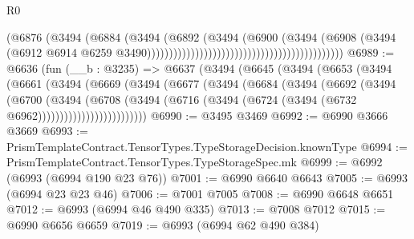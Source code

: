 \begin{lexlean}{R0}
\begin{coremodule}
                                                                        (@6876
                                                                          (@3494
                                                                            (@6884
                                                                              (@3494
                                                                                (@6892
                                                                                  (@3494
                                                                                    (@6900
                                                                                      (@3494
                                                                                        (@6908
                                                                                          (@3494
                                                                                            (@6912
                                                                                              @6914
                                                                                              @6259
                                                                                              @3490)))))))))))))))))))))))))))))))))))))))))))))
@6989 := @6636
    (fun (__b : @3235) =>
    @6637
      (@3494
        (@6645
          (@3494
            (@6653
              (@3494
                (@6661
                  (@3494
                    (@6669
                      (@3494
                        (@6677
                          (@3494
                            (@6684
                              (@3494
                                (@6692
                                  (@3494
                                    (@6700
                                      (@3494
                                        (@6708
                                          (@3494
                                            (@6716
                                              (@3494
                                                (@6724 (@3494 (@6732 @6962)))))))))))))))))))))))))
@6990 := @3495 @3469
@6992 := @6990 @3666 @3669
@6993 := PrismTemplateContract.TensorTypes.TypeStorageDecision.knownType
@6994 := PrismTemplateContract.TensorTypes.TypeStorageSpec.mk
@6999 := @6992 (@6993 (@6994 @190 @23 @76))
@7001 := @6990 @6640 @6643
@7005 := @6993 (@6994 @23 @23 @46)
@7006 := @7001 @7005
@7008 := @6990 @6648 @6651
@7012 := @6993 (@6994 @46 @490 @335)
@7013 := @7008 @7012
@7015 := @6990 @6656 @6659
@7019 := @6993 (@6994 @62 @490 @384)

\end{coremodule}
\end{lexlean}
